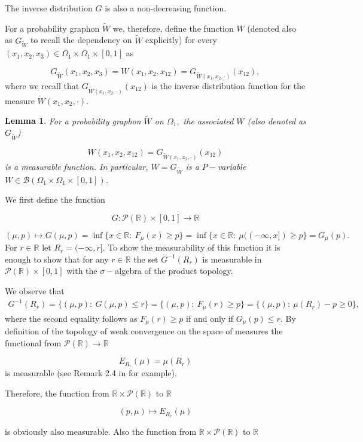 \documentclass[11pt]{article}
\newtheorem{lemma}[theorem]{Lemma}
\def\R{\mathbb{R}}
\newcommand{\cB}{{\mathcal B}}  %
\begin{document}
The inverse distribution $G$ is also a non-decreasing function.

For a probability graphon $\widetilde W$ we, therefore, define the function $W$ (denoted also as $G_{\widetilde W}$ to recall the dependency on $\widetilde W$ explicitly) for every $(x_1,x_2,x_3)\in \Omega_1\times \Omega_1 \times [0,1]$ as

$$G_{\widetilde W}(x_1,x_2,x_3)= W(x_1,x_2,x_{12})=G_{\widetilde W(x_1,x_2,\cdot)}(x_{12}),$$
where we recall that $G_{\widetilde W(x_1,x_2,\cdot)}(x_{12})$ is the inverse distribution function for the measure $\widetilde W(x_1,x_2,\cdot).$
\begin{lemma}\label{MeasProbGraphonFromPset}
For a probability graphon $\widetilde W$ on $\Omega_1,$ the associated $W$ (also denoted as $G_{\widetilde W}$) 

$$ W(x_1,x_2,x_{12})=G_{\widetilde W(x_1,x_2,\cdot)}(x_{12})$$
is a measurable function. In particular, $W=G_{\widetilde W}$ is a $P-$variable $W\in \cB(\Omega_1\times \Omega_1\times [0,1])$.
\end{lemma}
\proof

We first define the function 

$$
G:\mathcal{P(\R)}\times [0,1]\rightarrow \R
$$

$$
(\mu,p)\mapsto G(\mu,p)=\inf\{x\in\R: \ F_{\mu}(x)\geq p\} = \inf\{x\in\R: \ \mu((-\infty,x])\geq p\}= G_{\mu}(p).$$
For $r\in \R$ let $R_r=(-\infty,r].$
To show the measurability of this function it is enough to show that for any $r\in \R$  the set $G^{-1}(R_r)$ is measurable in $\mathcal{P(\R)}\times [0,1]$ with the $\sigma-$algebra of the product topology.

We observe that $$\begin{aligned}
    G^{-1}(R_r)=\{(\mu,p):\ G(\mu,p)\leq r\}=\{(\mu,p):\ F_{\mu}(r)\geq p\}=\{(\mu,p):\ \mu(R_r)-p\geq 0\},
\end{aligned}$$
where the second equality follows as $F_{\mu}(r)\geq p$ if and only if $G_{\mu}(p)\leq r.$
By definition of the topology of weak convergence on the space of measures the functional from $\mathcal{P}(\R)\rightarrow \R$ 

$$
E_{R_r}(\mu)=\mu(R_r)$$
is measurable (see Remark 2.4 in \cite{abraham2023probabilitygraphons} for example). 

Therefore, the function from $\R \times \mathcal{P}(\R)$ to $\R$

$$(p,\mu)\mapsto E_{R_r}(\mu)$$

is obviously also measurable. Also the function from $\R \times \mathcal{P}(\R)$ to $\R$
\end{document}
